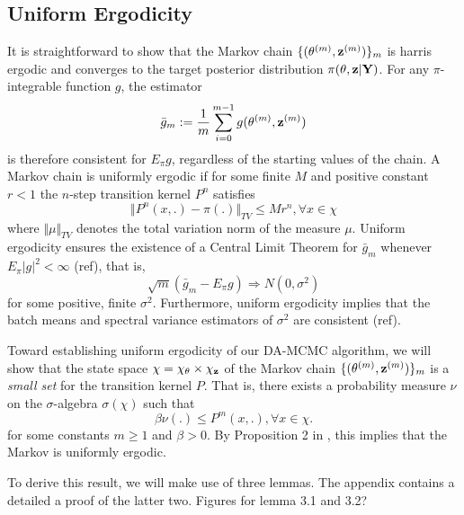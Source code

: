 \documentclass[11pt]{article}
\begin{document}
	
	\subsection{Uniform Ergodicity}
	
	It is straightforward to show that the Markov chain $\{(\theta^{(m)}, \mathbf{z}^{(m)})\}_m$ is harris ergodic and converges to the target posterior distribution $\pi(\theta, \mathbf{z}|\mathbf{Y})$. For any $\pi$-integrable function $g$, the estimator
	$$\bar{g}_m := \frac{1}{m} \sum_{i=0}^{m-1} g(\theta^{(m)}, \mathbf{z}^{(m)})$$
	is therefore consistent for $E_\pi g$, regardless of the starting values of the chain. A Markov chain is uniformly ergodic if for some finite $M$ and positive constant $r<1$ the $n$-step transition kernel $P^n$ satisfies
	$$
	\Vert P^n(x,.)-\pi(.)\Vert_{TV} \le M r^n, \forall x \in \chi
	$$
	where $\Vert \mu \Vert_{TV}$ denotes the total variation norm of the measure $\mu$.
	Uniform ergodicity ensures the existence of a Central Limit Theorem for $\bar{g}_m$ whenever $E_\pi |g|^2 < \infty$ (ref), that is,
	$$\sqrt{m}(\bar{g}_m - E_\pi g) \Rightarrow N(0, \sigma^2)$$
	for some positive, finite $\sigma^2$. Furthermore, uniform ergodicity implies that the batch means and spectral variance estimators of $\sigma^2$ are consistent (ref).
	
	
	
	Toward establishing uniform ergodicity of our DA-MCMC algorithm, we will show that the state space $\chi = \chi_{\theta}\times\chi_{\mathbf{z}}$ of the Markov chain $\{(\theta^{(m)}, \mathbf{z}^{(m)})\}_m$ is a \textit{small set} for the transition kernel $P$. That is, there exists a probability measure $\nu$ on the $\sigma$-algebra $\sigma(\chi)$ such that
	$$\beta \nu(.) \le P^m(x,.), \forall x\in \chi.$$
	for some constants $m \ge 1$ and $\beta > 0$.
	By Proposition 2 in \cite{Tierney.1994}, this implies that the Markov is uniformly ergodic. 
	
	To derive this result, we will make use of three lemmas. The appendix contains a detailed a proof of the latter two.
	\rm{Figures for lemma 3.1 and 3.2?}
	
\end{document}
